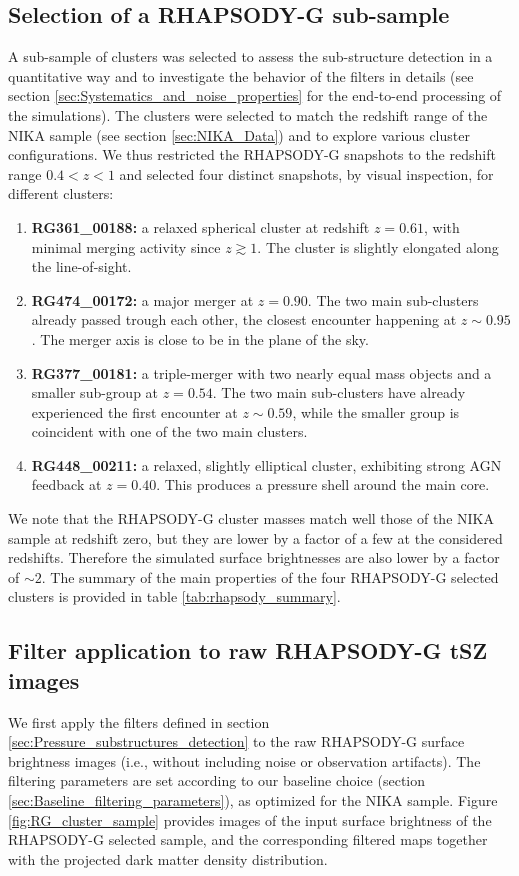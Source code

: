 \documentclass[twocolumn,traditabstract]{aa}
\begin{document}
\subsection{Selection of a RHAPSODY-G sub-sample}\label{sec:Selection_of_a_RHAPSODY-G_sub-sample}
A sub-sample of clusters was selected to assess the sub-structure detection in a quantitative way and to investigate the behavior of the filters in details (see section \ref{sec:Systematics_and_noise_properties} for the end-to-end processing of the simulations). The clusters were selected to match the redshift range of the NIKA sample (see section \ref{sec:NIKA_Data}) and to explore various cluster configurations. We thus restricted the RHAPSODY-G snapshots to the redshift range $0.4<z<1$ and selected four distinct snapshots, by visual inspection, for different clusters:
\begin{enumerate}
\item {\bf RG361\_00188:} a relaxed spherical cluster at redshift $z = 0.61$, with minimal merging activity since $z \gtrsim 1$. The cluster is slightly elongated along the line-of-sight.
\item {\bf RG474\_00172:} a major merger at $z = 0.90$. The two main sub-clusters already passed trough each other, the closest encounter happening at $z \sim 0.95$. The merger axis is close to be in the plane of the sky. 
\item {\bf RG377\_00181:} a triple-merger with two nearly equal mass objects and a smaller sub-group at $z = 0.54$. The two main sub-clusters have already experienced the first encounter at $z \sim 0.59$, while the smaller group is coincident with one of the two main clusters.
\item {\bf RG448\_00211:} a relaxed, slightly elliptical cluster, exhibiting strong AGN feedback at $z = 0.40$. This produces a pressure shell around the main core.
\end{enumerate}
We note that the RHAPSODY-G cluster masses match well those of the NIKA sample at redshift zero, but they are lower by a factor of a few at the considered redshifts. Therefore the simulated surface brightnesses are also lower by a factor of $\sim 2$. The summary of the main properties of the four RHAPSODY-G selected clusters is provided in table \ref{tab:rhapsody_summary}.

\subsection{Filter application to raw RHAPSODY-G tSZ images}
We first apply the filters defined in section \ref{sec:Pressure_substructures_detection} to the raw RHAPSODY-G surface brightness images (i.e., without including noise or observation artifacts). The filtering parameters are set according to our baseline choice (section \ref{sec:Baseline_filtering_parameters}), as optimized for the NIKA sample. Figure \ref{fig:RG_cluster_sample} provides images of the input surface brightness of the RHAPSODY-G selected sample, and the corresponding filtered maps together with the projected dark matter density distribution. 
\end{document}
